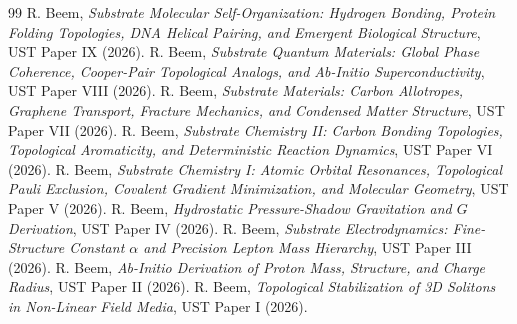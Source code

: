 \documentclass[11pt,a4paper]{article}
\begin{document}
	\begin{thebibliography}{99}
		 R. Beem, \textit{Substrate Molecular Self-Organization: Hydrogen Bonding, Protein Folding Topologies, DNA Helical Pairing, and Emergent Biological Structure}, UST Paper IX (2026).
		 R. Beem, \textit{Substrate Quantum Materials: Global Phase Coherence, Cooper-Pair Topological Analogs, and Ab-Initio Superconductivity}, UST Paper VIII (2026).
		 R. Beem, \textit{Substrate Materials: Carbon Allotropes, Graphene Transport, Fracture Mechanics, and Condensed Matter Structure}, UST Paper VII (2026).
		 R. Beem, \textit{Substrate Chemistry II: Carbon Bonding Topologies, Topological Aromaticity, and Deterministic Reaction Dynamics}, UST Paper VI (2026).
		 R. Beem, \textit{Substrate Chemistry I: Atomic Orbital Resonances, Topological Pauli Exclusion, Covalent Gradient Minimization, and Molecular Geometry}, UST Paper V (2026).
		 R. Beem, \textit{Hydrostatic Pressure-Shadow Gravitation and $G$ Derivation}, UST Paper IV (2026).
		 R. Beem, \textit{Substrate Electrodynamics: Fine-Structure Constant $\alpha$ and Precision Lepton Mass Hierarchy}, UST Paper III (2026).
		 R. Beem, \textit{Ab-Initio Derivation of Proton Mass, Structure, and Charge Radius}, UST Paper II (2026).
		 R. Beem, \textit{Topological Stabilization of 3D Solitons in Non-Linear Field Media}, UST Paper I (2026).
	\end{thebibliography}
	
\end{document}
